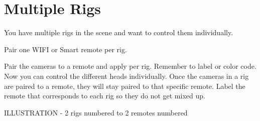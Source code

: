 \chapter{Multiple Rigs}
\pagecolor{white}
\label{chap:10}
\begin{fullwidth}


\problem

{\large You have multiple rigs in the scene and want to control them individually.
 \par}

\solution

{\large Pair one WIFI or Smart remote per rig. 
 \par}

Pair the cameras to a remote and apply per rig. Remember to label or color code. Now you can control the different heads individually. Once the cameras in a rig are paired to a remote, they will stay paired to that specific remote. Label the remote that corresponds to each rig so they do not get mixed up. 

ILLUSTRATION - 2 rigs numbered to 2 remotes numbered




\clearpage
\end{fullwidth}
